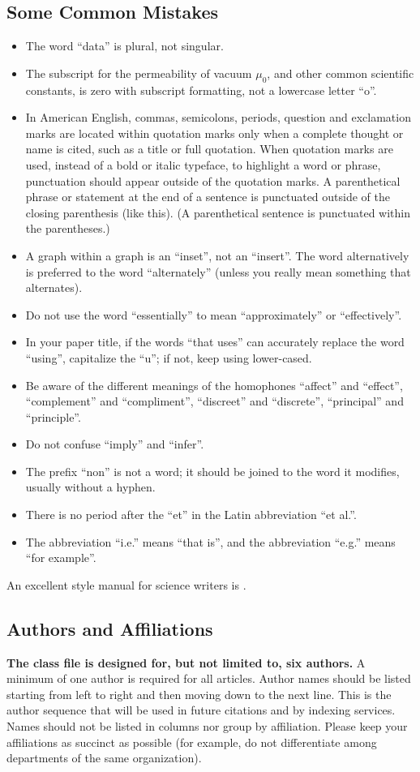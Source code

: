 \documentclass[conference]{IEEEtran}
\begin{document}
\subsection{Some Common Mistakes}\label{SCM}
\begin{itemize}
\item The word ``data'' is plural, not singular.
\item The subscript for the permeability of vacuum $\mu_{0}$, and other common scientific constants, is zero with subscript formatting, not a lowercase letter ``o''.
\item In American English, commas, semicolons, periods, question and exclamation marks are located within quotation marks only when a complete thought or name is cited, such as a title or full quotation. When quotation marks are used, instead of a bold or italic typeface, to highlight a word or phrase, punctuation should appear outside of the quotation marks. A parenthetical phrase or statement at the end of a sentence is punctuated outside of the closing parenthesis (like this). (A parenthetical sentence is punctuated within the parentheses.)
\item A graph within a graph is an ``inset'', not an ``insert''. The word alternatively is preferred to the word ``alternately'' (unless you really mean something that alternates).
\item Do not use the word ``essentially'' to mean ``approximately'' or ``effectively''.
\item In your paper title, if the words ``that uses'' can accurately replace the word ``using'', capitalize the ``u''; if not, keep using lower-cased.
\item Be aware of the different meanings of the homophones ``affect'' and ``effect'', ``complement'' and ``compliment'', ``discreet'' and ``discrete'', ``principal'' and ``principle''.
\item Do not confuse ``imply'' and ``infer''.
\item The prefix ``non'' is not a word; it should be joined to the word it modifies, usually without a hyphen.
\item There is no period after the ``et'' in the Latin abbreviation ``et al.''.
\item The abbreviation ``i.e.'' means ``that is'', and the abbreviation ``e.g.'' means ``for example''.
\end{itemize}
An excellent style manual for science writers is \cite{b7}.

\subsection{Authors and Affiliations}
\textbf{The class file is designed for, but not limited to, six authors.} A 
minimum of one author is required for all articles. Author names 
should be listed starting from left to right and then moving down to the 
next line. This is the author sequence that will be used in future citations 
and by indexing services. Names should not be listed in columns nor group by 
affiliation. Please keep your affiliations as succinct as possible (for 
example, do not differentiate among departments of the same organization).
\end{document}
